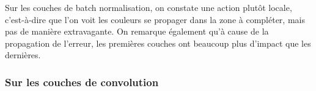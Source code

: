 \documentclass[12pt]{article}
\begin{document}
Sur les couches de batch normalisation, on constate une action plutôt locale, c'est-à-dire que l'on voit les couleurs se propager dans la zone à compléter, mais pas de manière extravagante. On remarque également qu'à cause de la propagation de l'erreur, les premières couches ont beaucoup plus d'impact que les dernières.

\newpage

\subsubsection*{Sur les couches de convolution}
\begin{figure}[htb]
\centering
  \hfill

\end{figure}
\end{document}
